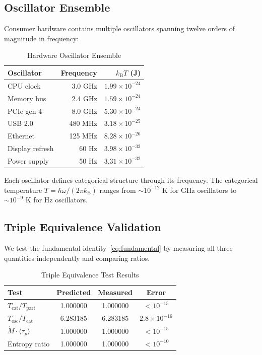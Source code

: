 \documentclass[twocolumn,10pt]{article}
\theoremstyle{definition}
\theoremstyle{remark}
\newcommand{\kB}{k_{\mathrm{B}}}
\begin{document}
\subsection{Oscillator Ensemble}

Consumer hardware contains multiple oscillators spanning twelve orders of magnitude in frequency:

\begin{table}[h]
\centering
\caption{Hardware Oscillator Ensemble}
\label{tab:oscillators}
\begin{tabular}{lrr}
\toprule
\textbf{Oscillator} & \textbf{Frequency} & \textbf{$\kB T$ (J)} \\
\midrule
CPU clock & 3.0 GHz & $1.99 \times 10^{-24}$ \\
Memory bus & 2.4 GHz & $1.59 \times 10^{-24}$ \\
PCIe gen 4 & 8.0 GHz & $5.30 \times 10^{-24}$ \\
USB 2.0 & 480 MHz & $3.18 \times 10^{-25}$ \\
Ethernet & 125 MHz & $8.28 \times 10^{-26}$ \\
Display refresh & 60 Hz & $3.98 \times 10^{-32}$ \\
Power supply & 50 Hz & $3.31 \times 10^{-32}$ \\
\bottomrule
\end{tabular}
\end{table}

Each oscillator defines categorical structure through its frequency. The categorical temperature $T = \hbar\omega/(2\pi\kB)$ ranges from $\sim 10^{-12}$ K for GHz oscillators to $\sim 10^{-9}$ K for Hz oscillators.

\subsection{Triple Equivalence Validation}

We test the fundamental identity~\eqref{eq:fundamental} by measuring all three quantities independently and comparing ratios.

\begin{table}[h]
\centering
\caption{Triple Equivalence Test Results}
\label{tab:triple_test}
\begin{tabular}{lccc}
\toprule
\textbf{Test} & \textbf{Predicted} & \textbf{Measured} & \textbf{Error} \\
\midrule
$T_{\text{cat}}/T_{\text{part}}$ & 1.000000 & 1.000000 & $<10^{-15}$ \\
$T_{\text{osc}}/T_{\text{cat}}$ & 6.283185 & 6.283185 & $2.8 \times 10^{-16}$ \\
$\dot{M} \cdot \langle\tau_p\rangle$ & 1.000000 & 1.000000 & $<10^{-15}$ \\
Entropy ratio & 1.000000 & 1.000000 & $<10^{-10}$ \\
\bottomrule
\end{tabular}
\end{table}
\end{document}
